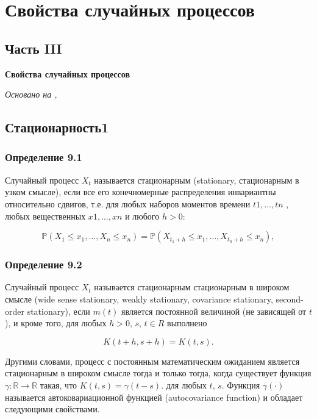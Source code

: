\chapter{Свойства случайных процессов}
\section*{Часть III} \textbf{Свойства случайных процессов}

\textit{Основано на \cite{adeshereKorrelyaciyaMezhduVremennymi2021},
\cite{panovTeoriyaSluchaynyhProcessov2018}}

\section{Стационарность1}
\subsection*{Определение 9.1} Случайный процесс \( X_t \) называется
стационарным (stationary, стационарным в узком смысле), если все его
конечномерные распределения инвариантны относительно сдвигов, т.е.
для любых наборов моментов времени $t1 , \dots, tn$ , любых вещественных
$x1 , \dots, xn$ и любого $h > 0$:

\[ \mathbb{P}(X_{1} \leq x_{1}, \ldots, X_{n} \leq x_{n}) =
\mathbb{P}(X_{t_1 + h} \leq x_{1}, \ldots, X_{t_n + h} \leq x_{n}), \]

\subsection*{Определение 9.2} Случайный процесс \( X_t \) называется
стационарным стационарным в широком смысле (wide sense stationary,
  weakly stationary, covariance stationary,
second-order stationary), если $m(t)$ является постоянной величиной
(не зависящей от $t$), и кроме того, для любых $h > 0$, $s$, $t \in R$ выполнено

\[ K(t + h, s + h) = K(t, s). \]

Другими словами, процесс с постоянным математическим ожиданием
является стационарным в широком смысле тогда и только тогда, когда
существует функция $ \gamma : \mathbb{R} \to \mathbb{R} $ такая, что $
K(t, s) = \gamma(t-s). $ для любых $t$, $s$. Функция $ \gamma
(\cdot) $ называется автоковариационной функцией
(autocovariance function)
и обладает следующими свойствами.


